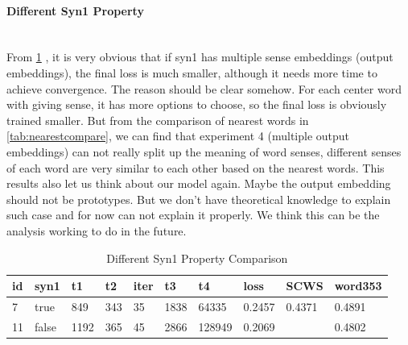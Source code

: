 \paragraph{Different Syn1 Property}  \ \\
From \ref{tab:group5} , it is very obvious that if syn1 has multiple sense embeddings (output embeddings), the final loss is much smaller, although it needs more time to achieve convergence. The reason should be clear somehow. For each center word with giving sense, it has more options to choose, so the final loss is obviously trained smaller. But from the comparison of nearest words in \ref{tab:nearestcompare}, we can find that experiment 4 (multiple output embeddings) can not really split up the meaning of word senses, different senses of each word are very similar to each other based on the nearest words. This results also let us think about our model again. Maybe the output embedding should not be prototypes. But we don't have theoretical knowledge to explain such case and for now can not explain it properly. We think this can be the analysis working to do in the future. 

\begin{table}[H]

\begin{center}
\begin{tabular}{|l|l|l|l|l|l|l|l|l|l|}
\hline
id& syn1 & t1 & t2 & iter & t3 & t4 &    loss  & 	SCWS & 	word353	   \\ 
\hline
7	& true		& 849	& 343	& 35	& 1838 &	64335 & 0.2457 &0.4371	&0.4891	   \\ 
\hline
11 	& false		& 1192	& 365	& 45	& 2866 &	128949 & 0.2069 & & 0.4802  \\ 
\hline
\end{tabular}
\caption{Different Syn1 Property Comparison} \label{tab:group5} 
\end{center}
\end{table}
 

